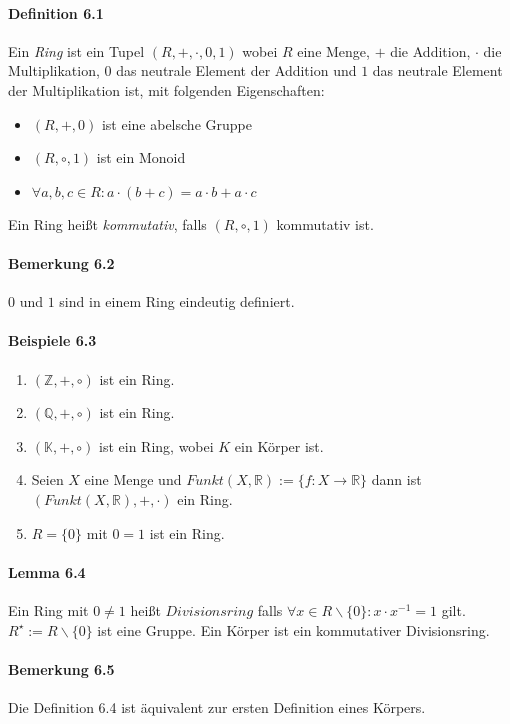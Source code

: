\documentclass{scrartcl}
\begin{document}
\paragraph{Definition 6.1} 
Ein \textit{Ring} ist ein Tupel $(R, +, \cdot, 0, 1)$ wobei $R$ eine Menge, $+$
die Addition, $\cdot$ die Multiplikation, $0$ das neutrale Element der Addition
und $1$ das neutrale Element der Multiplikation ist, mit folgenden Eigenschaften:
\begin{itemize}
\item $(R, +, 0)$ ist eine abelsche Gruppe
\item $(R, \circ, 1)$ ist ein Monoid
\item $\forall a,b,c \in R: a \cdot (b + c) = a \cdot b + a \cdot c$
\end{itemize}
Ein Ring heißt \textit{kommutativ}, falls $(R, \circ, 1)$ kommutativ ist.

\paragraph{Bemerkung 6.2}
$0$ und $1$ sind in einem Ring eindeutig definiert.

\paragraph{Beispiele 6.3}
\begin{enumerate}
\item $(\mathbb{Z}, +, \circ)$ ist ein Ring.
\item $(\mathbb{Q}, +, \circ)$ ist ein Ring.
\item $(\mathbb{K}, +, \circ)$ ist ein Ring, wobei $K$ ein Körper ist.
\item Seien $X$ eine Menge und $Funkt(X, \mathbb{R}) := \{f: X \to \mathbb{R}\}$
  dann ist $(Funkt(X, \mathbb{R}), +, \cdot)$ ein Ring.
\item $R = \{0\}$ mit  $0 = 1$ ist ein Ring.
\end{enumerate}

\paragraph{Lemma 6.4}
Ein Ring mit $0 \neq 1$ heißt $Divisionsring$ falls $\forall x \in R \backslash
\{0\}: x \cdot x^{-1} = 1$ gilt.
$R^\star := R \backslash \{ 0 \}$ ist eine Gruppe.
Ein Körper ist ein kommutativer Divisionsring.

\paragraph{Bemerkung 6.5}
Die Definition 6.4 ist äquivalent zur ersten Definition eines Körpers.
\end{document}
